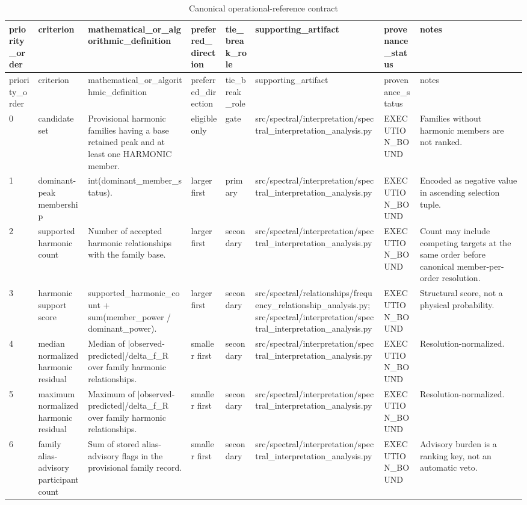 \begin{longtable}{llllllll}
\caption{Canonical operational-reference contract}\\
\toprule
priority\_order & criterion & mathematical\_or\_algorithmic\_definition & preferred\_direction & tie\_break\_role & supporting\_artifact & provenance\_status & notes \\
\midrule
\endfirsthead
\toprule
priority\_order & criterion & mathematical\_or\_algorithmic\_definition & preferred\_direction & tie\_break\_role & supporting\_artifact & provenance\_status & notes \\
\midrule
\endhead
0 & candidate set & Provisional harmonic families having a base retained peak and at least one HARMONIC member. & eligible only & gate & src/spectral/interpretation/spectral\_interpretation\_analysis.py & EXECUTION\_BOUND & Families without harmonic members are not ranked. \\
1 & dominant-peak membership & int(dominant\_member\_status). & larger first & primary & src/spectral/interpretation/spectral\_interpretation\_analysis.py & EXECUTION\_BOUND & Encoded as negative value in ascending selection tuple. \\
2 & supported harmonic count & Number of accepted harmonic relationships with the family base. & larger first & secondary & src/spectral/interpretation/spectral\_interpretation\_analysis.py & EXECUTION\_BOUND & Count may include competing targets at the same order before canonical member-per-order resolution. \\
3 & harmonic support score & supported\_harmonic\_count + sum(member\_power / dominant\_power). & larger first & secondary & src/spectral/relationships/frequency\_relationship\_analysis.py; src/spectral/interpretation/spectral\_interpretation\_analysis.py & EXECUTION\_BOUND & Structural score, not a physical probability. \\
4 & median normalized harmonic residual & Median of |observed-predicted|/delta\_f\_R over family harmonic relationships. & smaller first & secondary & src/spectral/interpretation/spectral\_interpretation\_analysis.py & EXECUTION\_BOUND & Resolution-normalized. \\
5 & maximum normalized harmonic residual & Maximum of |observed-predicted|/delta\_f\_R over family harmonic relationships. & smaller first & secondary & src/spectral/interpretation/spectral\_interpretation\_analysis.py & EXECUTION\_BOUND & Resolution-normalized. \\
6 & family alias-advisory participant count & Sum of stored alias-advisory flags in the provisional family record. & smaller first & secondary & src/spectral/interpretation/spectral\_interpretation\_analysis.py & EXECUTION\_BOUND & Advisory burden is a ranking key, not an automatic veto. \\

\end{longtable}
